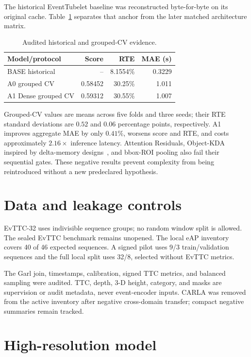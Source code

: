\documentclass[10pt,twocolumn]{article}
\begin{document}
The historical EventTubelet baseline was reconstructed byte-for-byte on its
original cache. Table~\ref{tab:history} separates that anchor from the later
matched architecture matrix.

\begin{table}[t]
\centering
\caption{Audited historical and grouped-CV evidence.}
\label{tab:history}
\small
\begin{tabular}{lrrr}
\toprule
Model/protocol & Score & RTE & MAE (s) \\
\midrule
BASE historical & -- & 8.1554\% & 0.3229 \\
A0 grouped CV & 0.58452 & 30.25\% & 1.011 \\
A1 Dense grouped CV & 0.59312 & 30.55\% & 1.007 \\
\bottomrule
\end{tabular}
\end{table}

Grouped-CV values are means across five folds and three seeds; their RTE standard
deviations are $0.52$ and $0.06$ percentage points, respectively. A1 improves
aggregate MAE by only $0.41\%$, worsens score and RTE, and costs approximately
$2.16\times$ inference latency. Attention Residuals, Object-KDA inspired by
delta-memory designs~\cite{kimik32026}, and bbox-ROI pooling also fail their
sequential gates. These negative results prevent complexity from being reintroduced
without a new predeclared hypothesis.

\section{Data and leakage controls}

EvTTC-32 uses indivisible sequence groups; no random window split is allowed. The
sealed EvTTC benchmark remains unopened. The local eAP inventory covers 40 of 46
expected sequences. A signed pilot uses 9/3 train/validation sequences and the full
local split uses 32/8, selected without EvTTC metrics.

The Garl join, timestamps, calibration, signed TTC metrics, and balanced sampling
were audited. TTC, depth, 3-D height, category, and masks are supervision or audit
metadata, never event-encoder inputs. CARLA was removed from the active inventory
after negative cross-domain transfer; compact negative summaries remain tracked.

\section{High-resolution model}
\end{document}
